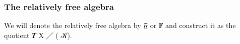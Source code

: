 \subsubsection{The relatively free algebra}\label{the-relatively-free-algebra}
We will denote the relatively free algebra by \ab 𝔉 or \ab 𝔽 and construct it as the quotient \af 𝑻 \ab X \af ╱ ( \ab 𝒦).
\ccpad
\begin{code}%
\>[0]\AgdaSpace{}%
\<%
\\
%
\\[\AgdaEmptyExtraSkip]%
\>[0]\AgdaSpace{}%
\<%
\\
\>[0][@{}l@{\AgdaIndent{0}}]%
\>[1]\AgdaSymbol{\{}\AgdaSpace{}%
\AgdaSpace{}%
\AgdaSymbol{:}\AgdaSpace{}%
\AgdaSymbol{\}\{}\AgdaSpace{}%
\AgdaSymbol{:}\AgdaSpace{}%
\AgdaSpace{}%
\AgdaSymbol{\}}\<%
\\
%
\>[1]\AgdaSymbol{\{}\AgdaSpace{}%
\AgdaSymbol{:}\AgdaSpace{}%
\AgdaSpace{}%
\AgdaSymbol{(}\AgdaSpace{}%
\AgdaSpace{}%
\AgdaSymbol{)}\AgdaSpace{}%
\AgdaSymbol{(}\AgdaSpace{}%
\AgdaSymbol{)\}}\AgdaSpace{}%
\<%
\\
%
\\[\AgdaEmptyExtraSkip]%
%
\>[1]\AgdaSpace{}%
\AgdaSymbol{:}\AgdaSpace{}%
\AgdaSpace{}%
\<%
\\
%
\>[1]\AgdaSpace{}%
\AgdaSymbol{=}\AgdaSpace{}%
\AgdaSymbol{(}\AgdaSpace{}%
\AgdaSpace{}%
\AgdaSymbol{(}\AgdaSpace{}%
\AgdaSymbol{))}\<%
\\
%
\\[\AgdaEmptyExtraSkip]%
%
\>[1]\AgdaSpace{}%
\AgdaSymbol{:}\AgdaSpace{}%
\AgdaSpace{}%
\AgdaSpace{}%
\<%
\\
%
\>[1]\AgdaSpace{}%
\AgdaSymbol{=}%
\>[6]\AgdaSpace{}%
\AgdaSpace{}%
\AgdaSpace{}%
\AgdaSymbol{(}\AgdaSpace{}%
\AgdaSymbol{)}\<%
\end{code}
\ccpad

